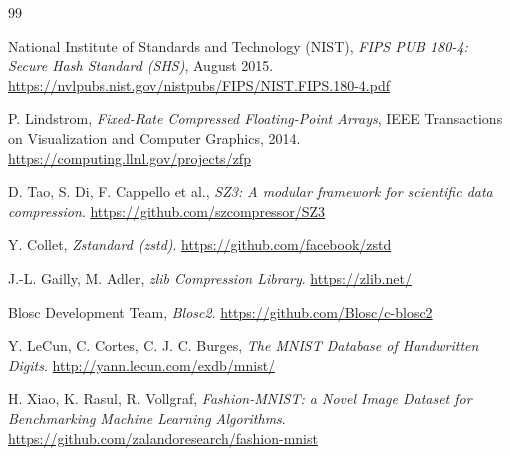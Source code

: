 \documentclass[11pt,a4paper]{article}
\begin{document}
\begin{thebibliography}{99}

National Institute of Standards and Technology (NIST),
\emph{FIPS PUB 180-4: Secure Hash Standard (SHS)}, August 2015.
\url{https://nvlpubs.nist.gov/nistpubs/FIPS/NIST.FIPS.180-4.pdf}

P. Lindstrom,
\emph{Fixed-Rate Compressed Floating-Point Arrays},
IEEE Transactions on Visualization and Computer Graphics, 2014.
\url{https://computing.llnl.gov/projects/zfp}

D. Tao, S. Di, F. Cappello et al.,
\emph{SZ3: A modular framework for scientific data compression}.
\url{https://github.com/szcompressor/SZ3}

Y. Collet,
\emph{Zstandard (zstd)}.
\url{https://github.com/facebook/zstd}

J.-L. Gailly, M. Adler,
\emph{zlib Compression Library}.
\url{https://zlib.net/}

Blosc Development Team,
\emph{Blosc2}.
\url{https://github.com/Blosc/c-blosc2}

Y. LeCun, C. Cortes, C. J. C. Burges,
\emph{The MNIST Database of Handwritten Digits}.
\url{http://yann.lecun.com/exdb/mnist/}

H. Xiao, K. Rasul, R. Vollgraf,
\emph{Fashion-MNIST: a Novel Image Dataset for Benchmarking Machine Learning Algorithms}.
\url{https://github.com/zalandoresearch/fashion-mnist}

\end{thebibliography}
\end{document}
